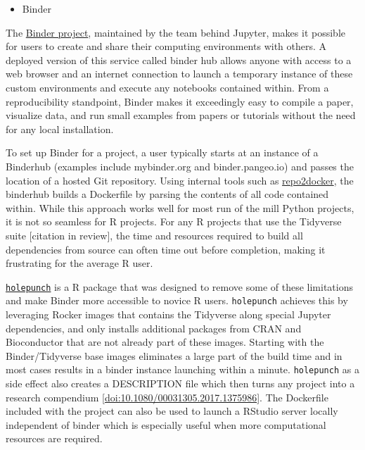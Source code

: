 \begin{itemize}
\tightlist
\item
  Binder
\end{itemize}

The \href{https://mybinder.readthedocs.io/en/latest/}{Binder project},
maintained by the team behind Jupyter, makes it possible for users to
create and share their computing environments with others. A deployed
version of this service called binder hub allows anyone with access to a
web browser and an internet connection to launch a temporary instance of
these custom environments and execute any notebooks contained within.
From a reproducibility standpoint, Binder makes it exceedingly easy to
compile a paper, visualize data, and run small examples from papers or
tutorials without the need for any local installation.

To set up Binder for a project, a user typically starts at an instance
of a Binderhub (examples include mybinder.org and binder.pangeo.io) and
passes the location of a hosted Git repository. Using internal tools
such as
\href{https://repo2docker.readthedocs.io/en/latest/config_files.html}{repo2docker},
the binderhub builds a Dockerfile by parsing the contents of all code
contained within. While this approach works well for most run of the
mill Python projects, it is not so seamless for R projects. For any R
projects that use the Tidyverse suite {[}citation in review{]}, the time
and resources required to build all dependencies from source can often
time out before completion, making it frustrating for the average R
user.

\href{https://github.com/karthik/holepunch}{\texttt{holepunch}} is a R
package that was designed to remove some of these limitations and make
Binder more accessible to novice R users. \texttt{holepunch} achieves
this by leveraging Rocker images that contains the Tidyverse along
special Jupyter dependencies, and only installs additional packages from
CRAN and Bioconductor that are not already part of these images.
Starting with the Binder/Tidyverse base images eliminates a large part
of the build time and in most cases results in a binder instance
launching within a minute. \texttt{holepunch} as a side effect also
creates a DESCRIPTION file which then turns any project into a research
compendium {[}\url{doi:10.1080/00031305.2017.1375986}{]}. The Dockerfile
included with the project can also be used to launch a RStudio server
locally independent of binder which is especially useful when more
computational resources are required.

